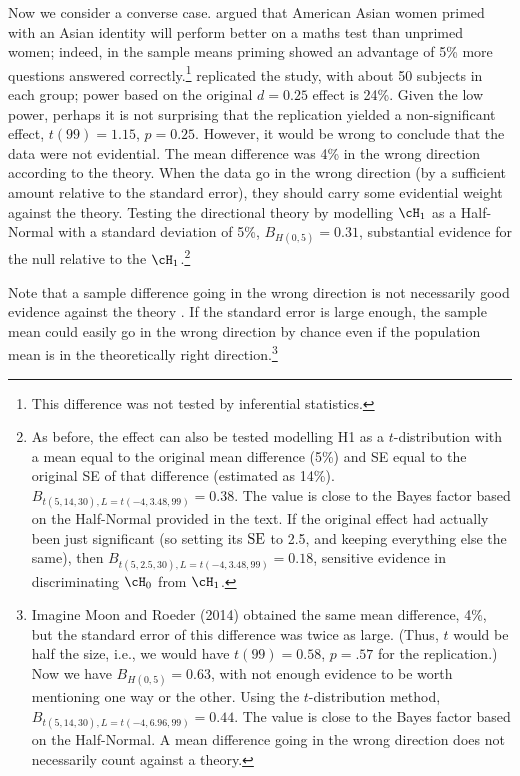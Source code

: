 Now we consider a converse case.  argued that American Asian women primed with an Asian identity will perform better on a maths test than unprimed women; indeed, in the sample means priming showed an advantage of 5\% more questions answered correctly.\footnote{This difference was not tested by inferential statistics.}  replicated the study, with about 50 subjects in each group; power based on the original $d = 0.25$ effect is 24\%. Given the low power, perhaps it is not surprising that the replication yielded a non-significant effect, $t(99) = 1.15$, $p = 0.25$. However, it would be wrong to conclude that the data were not evidential.  The mean difference was 4\% in the wrong direction according to the theory.  When the data go in the wrong direction (by a sufficient amount relative to the standard error), they should carry some evidential weight against the theory.  Testing the directional theory by modelling $\cH_1$ as a Half-Normal with a standard deviation of 5\%, $B_{H(0, 5)} = 0.31$, substantial evidence for the null relative to the $\cH_1$.\footnote{As before, the effect can also be tested modelling H1 as a $t$-distribution with a mean equal to the original mean difference (5\%) and SE equal to the original SE of that difference (estimated as 14\%). $B_{t(5, 14, 30), L = t(-4, 3.48, 99)} = 0.38$. The value is close to the Bayes factor based on the Half-Normal provided in the text. If the original effect had actually been just significant (so setting its $\mbox{SE}$ to 2.5, and keeping everything else the same), then $B_{t(5, 2.5, 30), L = t(-4, 3.48, 99)} = 0.18$, sensitive evidence in discriminating $\cH_0$ from $\cH_1$.}

Note that a sample difference going in the wrong direction is not necessarily good evidence against the theory \cite{Dienes2015}. If the standard error is large enough, the sample mean could easily go in the wrong direction by chance even if the population mean is in the theoretically right direction.\footnote{Imagine Moon and Roeder (2014) obtained the same mean difference, 4\%, but the standard error of this difference was twice as large. (Thus, $t$ would be half the size, i.e., we would have $t(99) = 0.58$, $p = .57$ for the replication.)  Now we have $B_{H(0, 5)} = 0.63$, with not enough evidence to be worth mentioning one way or the other. Using the $t$-distribution method, $B_{t(5, 14, 30), L = t(-4, 6.96, 99)} = 0.44$. The value is close to the Bayes factor based on the Half-Normal. A mean difference going in the wrong direction does not necessarily count against a theory.} 


